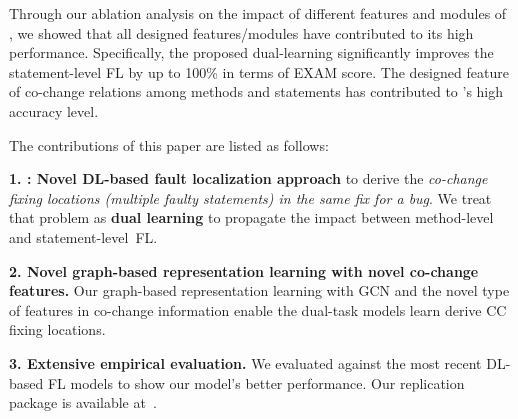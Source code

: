Through our ablation analysis on the impact of different features and
modules of {\tool}, we showed that all designed features/modules have
contributed to its high performance. Specifically, the proposed
dual-learning significantly improves the statement-level FL by up to
100\% in terms of EXAM score. The designed feature of co-change
relations among methods and statements has contributed to {\tool}'s
high accuracy level.





The contributions of this paper are listed as follows:

{\bf 1. {\tool}: Novel DL-based fault localization approach} to derive
the {\em co-change fixing locations (multiple faulty statements) in
  the same fix for a bug}. We treat that problem as {\bf dual learning}
to propagate the impact between method-level and
statement-level~FL.


{\bf 2. Novel graph-based representation learning with novel co-change
  features.} Our graph-based representation learning with GCN and the
novel type of features in co-change information enable the dual-task
models learn derive CC fixing locations.

{\bf 3. Extensive empirical evaluation.} We evaluated {\tool} against
the most recent DL-based FL models to show our model's better
performance. Our replication package is available
at~\cite{FixLocator2022}.

